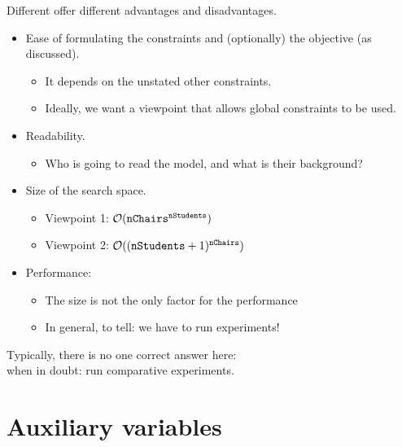 \documentclass{cons-beamer}
\begin{document}
\begin{frame}
  Different  offer different advantages and disadvantages.

  \begin{itemize}
    \item Ease of formulating the constraints and (optionally) the objective (as discussed).
    \begin{itemize}
      \item It depends on the unstated other constraints.
      \item Ideally, we want a viewpoint that allows global constraints to be used.
    \end{itemize}
    

    \item Readability. 
      \begin{itemize}
        \item Who is going to read the model, and what is their background?
      \end{itemize}
      
    \item Size of the search space. 
      \begin{itemize}
        \item Viewpoint 1: $\mathcal{O}(\mathtt{nChairs}^{\mathtt{nStudents}})$
        \item Viewpoint 2: $\mathcal{O}((\mathtt{nStudents} + 1)^{\mathtt{nChairs}})$
      \end{itemize} 
    
    \item Performance:
      \begin{itemize}
        \item The size is not the only factor for the performance
        \item In general,  to tell: we have to run experiments!
      \end{itemize}
  \end{itemize}
  

  \alert{Typically, there is no one correct answer here: \\ when in doubt: run comparative experiments.}
\end{frame}


\section{Auxiliary variables}
\end{document}
